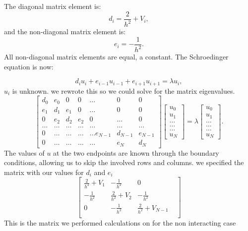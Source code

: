 \documentclass[10pt,showpacs,preprintnumbers,footinbib,amsmath,amssymb,aps,prl,twocolumn,groupedaddress,superscriptaddress,showkeys]{revtex4-1}
\begin{document}
The diagonal matrix element is:
\begin{equation*}
	d_i=\frac{2}{h^2}+V_i,
\end{equation*}
and the non-diagonal matrix element is:
\begin{equation*}
	e_i=-\frac{1}{h^2}.
\end{equation*}
All non-diagonal matrix elements are equal, a constant.
The Schroedinger equation is now:

\begin{equation*}
	d_iu_i+e_{i-1}u_{i-1}+e_{i+1}u_{i+1}  = \lambda u_i,
\end{equation*}
$u_i$ is unknown. we rewrote this so we could solve for the matrix eigenvalues.
\begin{equation}
	\begin{bmatrix}d_0 & e_0 & 0   & 0    & \dots  &0     & 0 \\
		e_1 & d_1 & e_1 & 0    & \dots  &0     &0 \\
		0   & e_2 & d_2 & e_2  &0       &\dots & 0\\
		\dots  & \dots & \dots & \dots  &\dots      &\dots & \dots\\
		0   & \dots & \dots & \dots  &\dots  e_{N-1}     &d_{N-1} & e_{N-1}\\
		0   & \dots & \dots & \dots  &\dots       &e_{N} & d_{N}
	\end{bmatrix}  \begin{bmatrix} u_{0} \\
	u_{1} \\
	\dots\\ \dots\\ \dots\\
	u_{N}
\end{bmatrix}=\lambda \begin{bmatrix} u_{0} \\
u_{1} \\
\dots\\ \dots\\ \dots\\
u_{N}
\end{bmatrix}.  
\label{eq:sematrix}
\end{equation}
The values of $u$ at the two endpoints are known through the boundary conditions, allowing us to skip the involved rows and columns. we specified the matrix with our values for $d_i$ and $e_i$
\begin{equation}
	\begin{bmatrix} \frac{2}{h^2}+V_1 & -\frac{1}{h^2} & 0        \\
		-\frac{1}{h^2} & \frac{2}{h^2}+V_2 & -\frac{1}{h^2}     \\
		0   & -\frac{1}{h^2} & \frac{2}{h^2}+V_{N-1} &     \\
	
	\end{bmatrix}
	\label{eq:matrixse} 
\end{equation}
This is the matrix we performed calculations on for the non interacting case
\end{document}
